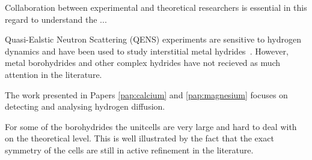 Collaboration between experimental and theoretical researchers is essential in this regard to understand the ...

Quasi-Ealstic Neutron Scattering (QENS) experiments are sensitive to hydrogen dynamics and have been used to study interstitial metal hydrides~\citemiss.
However, metal borohydrides and other complex hydrides have not recieved as much attention in the literature.

The work presented in Papers \ref{pap:calcium} and \ref{pap:magnesium} focuses on detecting and analysing hydrogen diffusion.

For some of the borohydrides the unitcells are very large and hard to deal with on the theoretical level.
This is well illustrated by the fact that the exact symmetry of the cells are still in active refinement in the literature.~\citemiss

\incomplete

